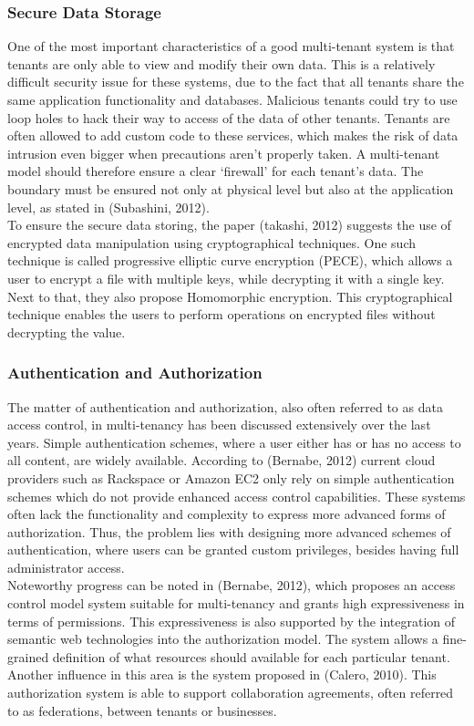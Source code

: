 \subsubsection{Secure Data Storage}
One of the most important characteristics of a good multi-tenant system is that tenants are only able to view and modify their own data. This is a relatively difficult security issue for these systems, due to the fact that all tenants share the same application functionality and databases. Malicious tenants could try to use loop holes to hack their way to access of the data of other tenants. Tenants are often allowed to add custom code to these services, which makes the risk of data intrusion even bigger when precautions aren’t properly taken. A multi-tenant model should therefore ensure a clear ‘firewall’ for each tenant’s data. The boundary must be ensured not only at physical level but also at the application level, as stated in (Subashini, 2012). \\
To ensure the secure data storing, the paper (takashi, 2012) suggests the use of encrypted data manipulation using cryptographical techniques. One such technique is called progressive elliptic curve encryption (PECE), which allows a user to encrypt a file with multiple keys, while decrypting it with a single key. Next to that, they also propose Homomorphic encryption. This cryptographical technique enables the users to perform operations on encrypted files without decrypting the value.\\

\subsubsection{Authentication and Authorization}
The matter of authentication and authorization, also often referred to as data access control, in multi-tenancy has been discussed extensively over the last years. Simple authentication schemes, where a user either has or has no access to all content, are widely available. According to (Bernabe, 2012) current cloud providers such as Rackspace or Amazon EC2 only rely on simple authentication schemes which do not provide enhanced access control capabilities. These systems often lack the functionality and complexity to express more advanced forms of authorization. Thus, the problem lies with designing more advanced schemes of authentication, where users can be granted custom privileges, besides having full administrator access.\\
Noteworthy progress can be noted in (Bernabe, 2012), which proposes an access control model system suitable for multi-tenancy and grants high expressiveness in terms of permissions. This expressiveness is also supported by the integration of semantic web technologies into the authorization model. The system allows a fine-grained definition of what resources should available for each particular tenant. Another influence in this area is the system proposed in (Calero, 2010). This authorization system is able to support collaboration agreements, often referred to as federations, between tenants or businesses.\\

